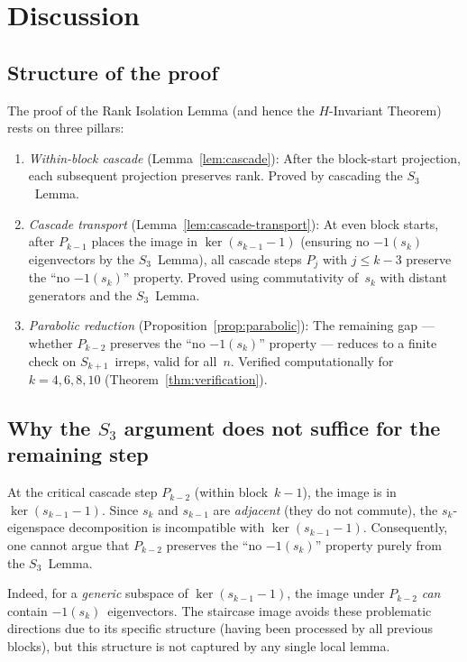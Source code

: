 \documentclass[12pt]{article}
\theoremstyle{definition}
\theoremstyle{remark}
\begin{document}
\section{Discussion}

\subsection*{Structure of the proof}

The proof of the Rank Isolation Lemma (and hence the $H$-Invariant Theorem)
rests on three pillars:

\begin{enumerate}
\item \emph{Within-block cascade} (Lemma~\ref{lem:cascade}):
  After the block-start projection, each subsequent projection preserves rank.
  Proved by cascading the $S_3$~Lemma.

\item \emph{Cascade transport} (Lemma~\ref{lem:cascade-transport}):
  At even block starts, after $P_{k-1}$ places the image in $\ker(s_{k-1} - 1)$
  (ensuring no $-1(s_k)$ eigenvectors by the $S_3$~Lemma), all cascade steps
  $P_j$ with $j \le k - 3$ preserve the ``no $-1(s_k)$'' property.  Proved
  using commutativity of~$s_k$ with distant generators and the $S_3$~Lemma.

\item \emph{Parabolic reduction} (Proposition~\ref{prop:parabolic}):
  The remaining gap --- whether $P_{k-2}$ preserves the ``no $-1(s_k)$'' property
  --- reduces to a finite check on $S_{k+1}$~irreps, valid for all~$n$.
  Verified computationally for $k = 4, 6, 8, 10$
  (Theorem~\ref{thm:verification}).
\end{enumerate}

\subsection*{Why the $S_3$ argument does not suffice for the remaining step}

At the critical cascade step $P_{k-2}$ (within block~$k{-}1$), the image is in
$\ker(s_{k-1} - 1)$.  Since $s_k$ and $s_{k-1}$ are \emph{adjacent} (they do
not commute), the $s_k$-eigenspace decomposition is incompatible with
$\ker(s_{k-1} - 1)$.  Consequently, one cannot argue that $P_{k-2}$ preserves
the ``no $-1(s_k)$'' property purely from the $S_3$~Lemma.

Indeed, for a \emph{generic} subspace of $\ker(s_{k-1} - 1)$, the image under
$P_{k-2}$ \emph{can} contain $-1(s_k)$~eigenvectors.  The staircase image
avoids these problematic directions due to its specific structure (having been
processed by all previous blocks), but this structure is not captured by any
single local lemma.
\end{document}
